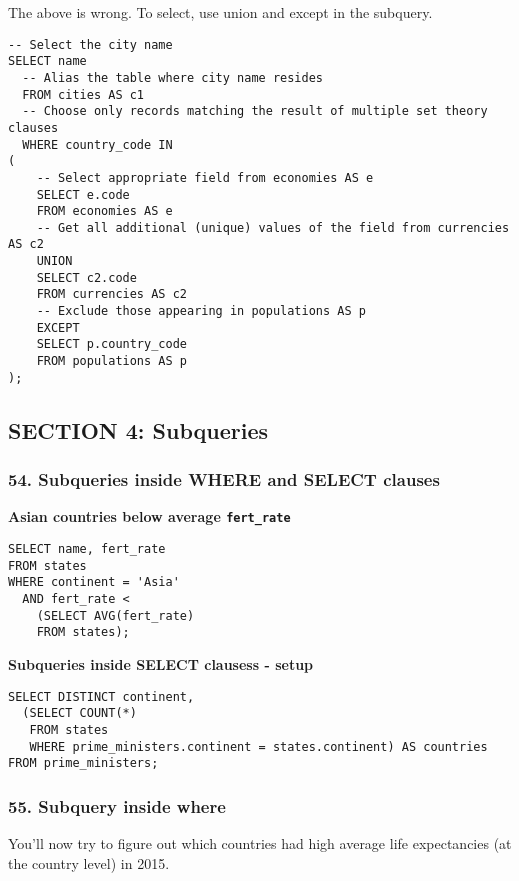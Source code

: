 \documentclass[
]{article}
\begin{document}
The above is wrong. To select, use union and except in the subquery.

\begin{verbatim}
-- Select the city name
SELECT name
  -- Alias the table where city name resides
  FROM cities AS c1
  -- Choose only records matching the result of multiple set theory clauses
  WHERE country_code IN
(
    -- Select appropriate field from economies AS e
    SELECT e.code
    FROM economies AS e
    -- Get all additional (unique) values of the field from currencies AS c2   
    UNION
    SELECT c2.code
    FROM currencies AS c2
    -- Exclude those appearing in populations AS p  
    EXCEPT
    SELECT p.country_code
    FROM populations AS p
);
\end{verbatim}

\hypertarget{section-4-subqueries}{%
\subsection{SECTION 4: Subqueries}\label{section-4-subqueries}}

\hypertarget{subqueries-inside-where-and-select-clauses}{%
\subsubsection{54. Subqueries inside WHERE and SELECT
clauses}\label{subqueries-inside-where-and-select-clauses}}

\textbf{Asian countries below average \texttt{fert\_rate}}

\begin{verbatim}
SELECT name, fert_rate
FROM states
WHERE continent = 'Asia'
  AND fert_rate < 
    (SELECT AVG(fert_rate)
    FROM states);
\end{verbatim}

\textbf{Subqueries inside SELECT clausess - setup}

\begin{verbatim}
SELECT DISTINCT continent,
  (SELECT COUNT(*)
   FROM states
   WHERE prime_ministers.continent = states.continent) AS countries
FROM prime_ministers;
\end{verbatim}

\hypertarget{subquery-inside-where}{%
\subsubsection{55. Subquery inside where}\label{subquery-inside-where}}

You'll now try to figure out which countries had high average life
expectancies (at the country level) in 2015.
\end{document}
